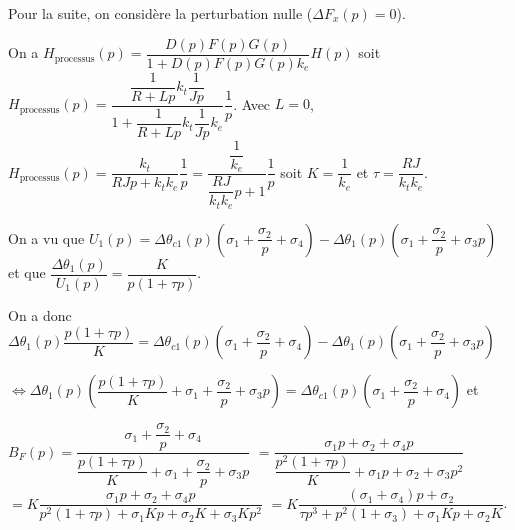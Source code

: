 \else
\fi


\ifprof
\else
Pour la suite, on considère la perturbation nulle ($\Delta F_x(p)=0$).
\fi

\ifprof
\begin{corrige}
On a $H_{\text{processus}}(p)= \dfrac{D(p)F(p)G(p)}{1+D(p)F(p)G(p) k_e} H(p)$
soit $H_{\text{processus}}(p)= \dfrac{\dfrac{1}{R+Lp}k_t\dfrac{1}{Jp}}{1+\dfrac{1}{R+Lp}k_t\dfrac{1}{Jp} k_e} \dfrac{1}{p}$.
Avec $L=0$, 
$H_{\text{processus}}(p) =\dfrac{k_t}{RJp+k_t k_e} \dfrac{1}{p}=\dfrac{\dfrac{1}{k_e}}{\dfrac{RJ}{k_t k_e}p+1} \dfrac{1}{p}$ soit $K = \dfrac{1}{k_e}$ et $\tau = \dfrac{RJ}{k_t k_e}$.
\end{corrige}
\else
\fi



\ifprof
\begin{corrige}
On a vu que $U_1(p)= \Delta \theta_{c1}(p) \left(\sigma_1 + \dfrac{\sigma_2}{p} +\sigma_4\right) -\Delta \theta_1(p) \left(\sigma_1 + \dfrac{\sigma_2}{p} + \sigma_3p\right)$ et 
que $\dfrac{\Delta \theta_1(p)}{U_1(p)}=\dfrac{K}{p\left(1+\tau p \right)}$.

On a donc 
$\Delta \theta_1(p) \dfrac{p\left(1+\tau p \right)}{K}= \Delta \theta_{c1}(p) \left(\sigma_1 + \dfrac{\sigma_2}{p} +\sigma_4\right) -\Delta \theta_1(p) \left(\sigma_1 + \dfrac{\sigma_2}{p} + \sigma_3p\right)$

$\Leftrightarrow \Delta \theta_1(p) \left(\dfrac{p\left(1+\tau p \right)}{K}  + \sigma_1 + \dfrac{\sigma_2}{p} + \sigma_3p\right)= \Delta \theta_{c1}(p) \left(\sigma_1 + \dfrac{\sigma_2}{p} +\sigma_4\right) $ et 

$B_F(p) = \dfrac{\sigma_1 + \dfrac{\sigma_2}{p} +\sigma_4}{\dfrac{p\left(1+\tau p \right)}{K}  + \sigma_1 + \dfrac{\sigma_2}{p} + \sigma_3p}$ 
$= \dfrac{\sigma_1 p + \sigma_2 + \sigma_4 p}{\dfrac{p^2\left(1+\tau p \right)}{K}  + \sigma_1p + \sigma_2 + \sigma_3p^2}$
$= K \dfrac{\sigma_1 p + \sigma_2 + \sigma_4 p}{p^2\left(1+\tau p \right)  + \sigma_1 K p + \sigma_2 K  + \sigma_3 Kp^2}$
$= K \dfrac{\left(\sigma_1+ \sigma_4 \right) p + \sigma_2 }{ \tau p^3 + p^2\left(1+\sigma_3 \right)  + \sigma_1 K p + \sigma_2 K  }$.
\end{corrige}
\else
\fi



